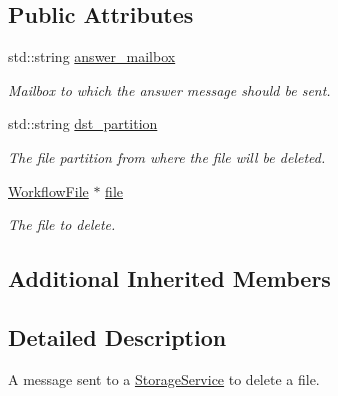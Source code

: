 \subsection*{Public Attributes}
\begin{DoxyCompactItemize}
\item 
\mbox{\label{classwrench_1_1_storage_service_file_delete_request_message_a177fd6bf8eb030201630fd55d81eef9d}} 
std\+::string \hyperlink{classwrench_1_1_storage_service_file_delete_request_message_a177fd6bf8eb030201630fd55d81eef9d}{answer\+\_\+mailbox}
\begin{DoxyCompactList}\small\item\em Mailbox to which the answer message should be sent. \end{DoxyCompactList}\item 
\mbox{\label{classwrench_1_1_storage_service_file_delete_request_message_ac0af21407ec5e7414fb16e78c12a8000}} 
std\+::string \hyperlink{classwrench_1_1_storage_service_file_delete_request_message_ac0af21407ec5e7414fb16e78c12a8000}{dst\+\_\+partition}
\begin{DoxyCompactList}\small\item\em The file partition from where the file will be deleted. \end{DoxyCompactList}\item 
\mbox{\label{classwrench_1_1_storage_service_file_delete_request_message_ac971507bc489c43d33b52ae6006bbe39}} 
\hyperlink{classwrench_1_1_workflow_file}{Workflow\+File} $\ast$ \hyperlink{classwrench_1_1_storage_service_file_delete_request_message_ac971507bc489c43d33b52ae6006bbe39}{file}
\begin{DoxyCompactList}\small\item\em The file to delete. \end{DoxyCompactList}\end{DoxyCompactItemize}
\subsection*{Additional Inherited Members}


\subsection{Detailed Description}
A message sent to a \hyperlink{classwrench_1_1_storage_service}{Storage\+Service} to delete a file. 

